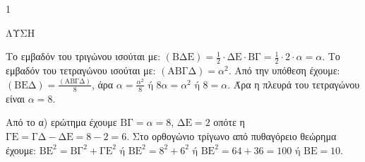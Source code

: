 \begin{ylh}{1}
    \item [Ύλη από εικόνα]
\end{ylh}
ΛΥΣΗ
\begin{alist}
    \item Το εμβαδόν του τριγώνου  ισούται με: $(\text{ΒΔΕ}) = \frac{1}{2} \cdot \text{ΔΕ} \cdot \text{ΒΓ} = \frac{1}{2} \cdot 2 \cdot \alpha = \alpha$.
    Το εμβαδόν του τετραγώνου  ισούται με: $(\text{ΑΒΓΔ}) = \alpha^2$.
    Από την υπόθεση έχουμε: $(\text{ΒΕΔ}) = \frac{(\text{ΑΒΓΔ})}{8}$, άρα $\alpha = \frac{\alpha^2}{8} \text{ ή } 8\alpha = \alpha^2 \text{ ή } 8 = \alpha$.
    Άρα η πλευρά του τετραγώνου είναι $\alpha = 8$.
    \item Από το α) ερώτημα έχουμε $\text{ΒΓ} = \alpha = 8$, $\text{ΔΕ} = 2$ οπότε η $\text{ΓΕ} = \text{ΓΔ} - \text{ΔΕ} = 8 - 2 = 6$.
    Στο ορθογώνιο τρίγωνο  από πυθαγόρειο θεώρημα έχουμε: $\text{ΒΕ}^2 = \text{ΒΓ}^2 + \text{ΓΕ}^2 \text{ ή } \text{ΒΕ}^2 = 8^2 + 6^2 \text{ ή } \text{ΒΕ}^2 = 64 + 36 = 100 \text{ ή } \text{ΒΕ} = 10$.
\end{alist}